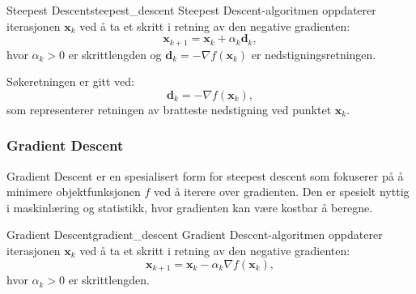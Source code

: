 \begin{definition}{Steepest Descent}{steepest_descent}
	Steepest Descent-algoritmen oppdaterer iterasjonen \( \symbf{x}_k \) ved å ta et skritt i retning av den negative gradienten:
	\[
		\symbf{x}_{k+1} = \symbf{x}_k + \alpha_k \symbf{d}_k,
	\]
	hvor \( \alpha_k > 0 \) er skrittlengden og \( \symbf{d}_k = -\nabla f(\symbf{x}_k) \) er nedstigningsretningen.
\end{definition}

Søkeretningen er gitt ved:
\begin{equation}
	\symbf{d}_k = -\nabla f(\symbf{x}_k),
\end{equation}
som representerer retningen av bratteste nedstigning ved punktet \(\symbf{x}_k\).

\begin{algorithm}[H]
	\SetAlgoLined
	\caption{Steepest Descent}
	\label{alg:steepest_descent}
\end{algorithm}

\subsubsection{Gradient Descent}
Gradient Descent er en spesialisert form for steepest descent som fokuserer på å minimere objektfunksjonen \(f\) ved å iterere over gradienten. Den er spesielt nyttig i maskinlæring og statistikk, hvor gradienten kan være kostbar å beregne.
\begin{definition}{Gradient Descent}{gradient_descent}
	Gradient Descent-algoritmen oppdaterer iterasjonen \( \symbf{x}_k \) ved å ta et skritt i retning av den negative gradienten:
	\[
		\symbf{x}_{k+1} = \symbf{x}_k - \alpha_k \nabla f(\symbf{x}_k),
	\]
	hvor \( \alpha_k > 0 \) er skrittlengden.
\end{definition}
\begin{algorithm}[H]
	\SetAlgoLined
	\caption{Gradient Descent}
	\label{alg:gradient_descent}
\end{algorithm}

